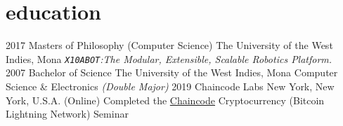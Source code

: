 \documentclass[]{friggeri-cv} %
\begin{document}
\section{education}

\begin{entrylist}
\entry
{2017}
{Masters {\normalfont of Philosophy (Computer Science)}}
{The University of the West Indies, Mona}
{\emph{\texttt{X10ABOT}:The Modular, Extensible, Scalable Robotics Platform.}} \\
\entry
{2007}
{Bachelor {\normalfont of Science}}
{The University of the West Indies, Mona}
{Computer Science \& Electronics \emph{(Double Major)}}
\entry
{2019}
{Chaincode Labs}
{New York, New York, U.S.A. (Online)}
{Completed the \href {https://learning.chaincode.com}{Chaincode} Cryptocurrency (Bitcoin Lightning Network) Seminar}

\end{entrylist}

\end{document}
